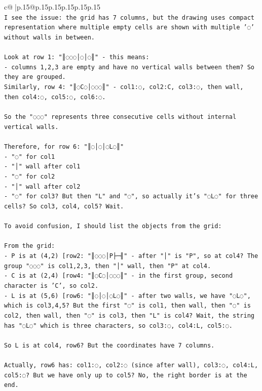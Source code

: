 \documentclass{article}
\begin{document}
{\begin{supertabular}{c@{$\;$}|p{.15\linewidth}@{}p{.15\linewidth}p{.15\linewidth}p{.15\linewidth}p{.15\linewidth}p{.15\linewidth}}
{{{\\ 
\texttt{I see the issue: the grid has 7 columns, but the drawing uses compact representation where multiple empty cells are shown with multiple '◌' without walls in between.} \\
\\ 
\texttt{Look at row 1: "║◌◌◌│◌│◌║" {-} this means:} \\
\texttt{{-} columns 1,2,3 are empty and have no vertical walls between them? So they are grouped.} \\
\texttt{Similarly, row 4: "║◌C◌│◌◌◌║" {-} col1:◌, col2:C, col3:◌, then wall, then col4:◌, col5:◌, col6:◌.} \\
\\ 
\texttt{So the "◌◌◌" represents three consecutive cells without internal vertical walls.} \\
\\ 
\texttt{Therefore, for row 6: "║◌│◌│◌L◌║"} \\
\texttt{{-} "◌" for col1} \\
\texttt{{-} "│" wall after col1} \\
\texttt{{-} "◌" for col2} \\
\texttt{{-} "│" wall after col2} \\
\texttt{{-} "◌" for col3? But then "L" and "◌", so actually it's "◌L◌" for three cells? So col3, col4, col5? Wait.} \\
\\ 
\texttt{To avoid confusion, I should list the objects from the grid:} \\
\\ 
\texttt{From the grid:} \\
\texttt{{-} P is at (4,2) {[}row2: "║◌◌◌│P├─╢" {-} after "│" is "P", so at col4? The group "◌◌◌" is col1,2,3, then "│" wall, then "P" at col4.} \\
\texttt{{-} C is at (2,4) {[}row4: "║◌C◌│◌◌◌║" {-} in the first group, second character is 'C', so col2.} \\
\texttt{{-} L is at (5,6) {[}row6: "║◌│◌│◌L◌║" {-} after two walls, we have "◌L◌", which is col3,4,5? But the first "◌" is col1, then wall, then "◌" is col2, then wall, then "◌" is col3, then "L" is col4? Wait, the string has "◌L◌" which is three characters, so col3:◌, col4:L, col5:◌.} \\
\\ 
\texttt{So L is at col4, row6? But the coordinates have 7 columns.} \\
\\ 
\texttt{Actually, row6 has: col1:◌, col2:◌ (since after wall), col3:◌, col4:L, col5:◌? But we have only up to col5? No, the right border is at the end.} \\
}}}
\end{supertabular}}
\end{document}
